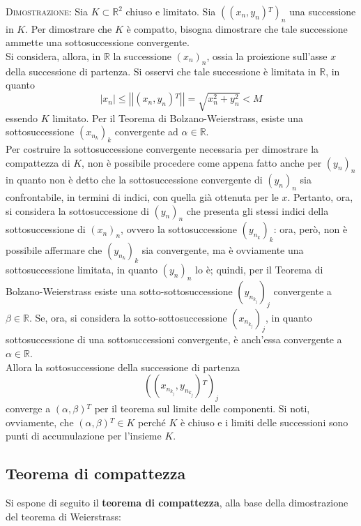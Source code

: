 \documentclass[a4paper]{extarticle}
\begin{document}
\vspace{2em}
\noindent
\normalfont \normalsize
\textsc{Dimostrazione}: Sia $K \subset \mathbb{R}^2$ chiuso e limitato. Sia $\left((x_n,y_n){^T}\right)_n$ una successione in $K$. Per dimostrare che $K$ è compatto, bisogna dimostrare che tale successione ammette una sottosuccessione convergente.\\
Si considera, allora, in $\mathbb{R}$ la successione $(x_n)_n$, ossia la proiezione sull'asse $x$ della successione di partenza. Si osservi che tale successione è limitata in $\mathbb{R}$, in quanto
\[\left \vert x_n \right \vert \leq \left \vert \left \vert (x_n,y_n){^T} \right \vert \right \vert = \sqrt{x_n^2+y_n^2} < M\]
essendo $K$ limitato. Per il Teorema di Bolzano-Weierstrass, esiste una sottosuccessione $(x_{n_k})_k$ convergente ad $\alpha \in \mathbb{R}$.\\
Per costruire la sottosuccessione convergente necessaria per dimostrare la compattezza di $K$, non è possibile procedere come appena fatto anche per $(y_n)_n$ in quanto non è detto che la sottosuccessione convergente di $(y_n)_n$ sia confrontabile, in termini di indici, con quella già ottenuta per le $x$. Pertanto, ora, si considera la sottosuccessione di $(y_n)_n$ che presenta gli stessi indici della sottosuccessione di $(x_n)_n$, ovvero la sottosuccessione $(y_{n_k})_k$: ora, però, non è possibile affermare che $(y_{n_k})_k$ sia convergente, ma è ovviamente una sottosuccessione limitata, in quanto $(y_n)_n$ lo è; quindi, per il Teorema di Bolzano-Weierstrass esiste una sotto-sottosuccessione $(y_{n_{k_j}})_j$ convergente a $\beta \in \mathbb{R}$. Se, ora, si considera la sotto-sottosuccessione $(x_{n_{k_j}})_j$, in quanto sottosuccessione di una sottosuccessioni convergente, è anch'essa convergente a $\alpha \in \mathbb{R}$.\\
Allora la sottosuccessione della successione di partenza
\[\left((x_{n_{k_j}}, y_{n_{k_j}}){^T}\right)_j\]
converge a $(\alpha,\beta){^T}$ per il teorema sul limite delle componenti. Si noti, ovviamente, che $(\alpha,\beta){^T} \in K$ perché $K$ è chiuso e i limiti delle successioni sono punti di accumulazione per l'insieme $K$.

\newpage
\noindent
\subsection{Teorema di compattezza}
Si espone di seguito il \textbf{teorema di compattezza}, alla base della dimostrazione del teorema di Weierstrass:
\end{document}
